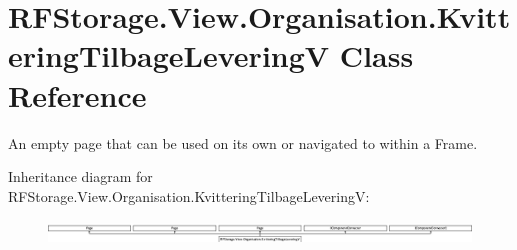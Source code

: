\hypertarget{class_r_f_storage_1_1_view_1_1_organisation_1_1_kvittering_tilbage_levering_v}{}\section{R\+F\+Storage.\+View.\+Organisation.\+Kvittering\+Tilbage\+LeveringV Class Reference}
\label{class_r_f_storage_1_1_view_1_1_organisation_1_1_kvittering_tilbage_levering_v}


An empty page that can be used on its own or navigated to within a Frame.  


Inheritance diagram for R\+F\+Storage.\+View.\+Organisation.\+Kvittering\+Tilbage\+LeveringV\+:\begin{figure}[H]
\begin{center}
\leavevmode
\includegraphics[height=0.649275cm]{class_r_f_storage_1_1_view_1_1_organisation_1_1_kvittering_tilbage_levering_v}
\end{center}
\end{figure}
